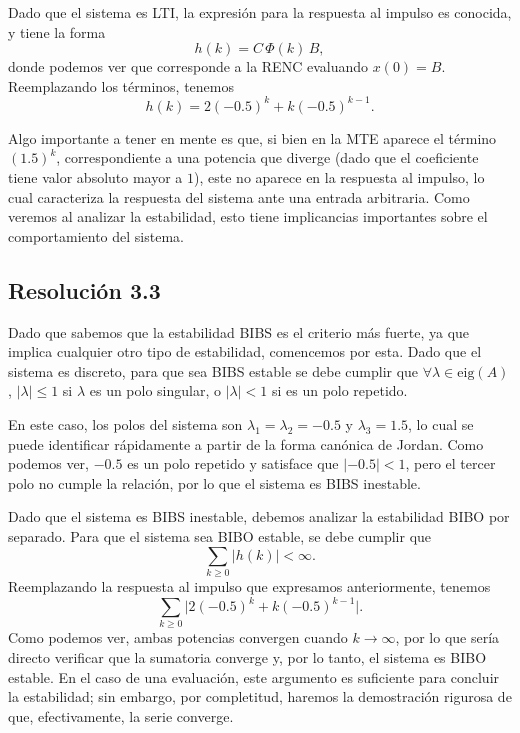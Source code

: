 \documentclass[
  11pt,
  letterpaper,
   addpoints,
  answers
  ]{exam}
\begin{document}
\begin{questions}
\begin{solution}
Dado que el sistema es LTI, la expresión para la respuesta al impulso es conocida, y tiene la forma
\begin{equation}
h(k)=C\,\Phi(k)\,B,
\tag{9}
\end{equation}
donde podemos ver que corresponde a la RENC evaluando $x(0)=B$. Reemplazando los términos, tenemos
\begin{equation}
h(k)=2(-0.5)^{k}+k(-0.5)^{k-1}.
\tag{10}
\end{equation}

Algo importante a tener en mente es que, si bien en la MTE aparece el término $(1.5)^{k}$, correspondiente a una potencia que diverge (dado que el coeficiente tiene valor absoluto mayor a $1$), este no aparece en la respuesta al impulso, lo cual caracteriza la respuesta del sistema ante una entrada arbitraria. Como veremos al analizar la estabilidad, esto tiene implicancias importantes sobre el comportamiento del sistema.

\subsection*{Resolución 3.3}

Dado que sabemos que la estabilidad BIBS es el criterio más fuerte, ya que implica cualquier otro tipo de estabilidad, comencemos por esta. Dado que el sistema es discreto, para que sea BIBS estable se debe cumplir que $\forall \lambda \in \mathrm{eig}(A)$, $|\lambda|\le 1$ si $\lambda$ es un polo singular, o $|\lambda|<1$ si es un polo repetido.

En este caso, los polos del sistema son $\lambda_{1}=\lambda_{2}=-0.5$ y $\lambda_{3}=1.5$, lo cual se puede identificar rápidamente a partir de la forma canónica de Jordan. Como podemos ver, $-0.5$ es un polo repetido y satisface que $|{-0.5}|<1$, pero el tercer polo no cumple la relación, por lo que el sistema es BIBS inestable.

Dado que el sistema es BIBS inestable, debemos analizar la estabilidad BIBO por separado. Para que el sistema sea BIBO estable, se debe cumplir que
\begin{equation}
\sum_{k\ge 0} |h(k)| < \infty.
\tag{11}
\end{equation}
Reemplazando la respuesta al impulso que expresamos anteriormente, tenemos
\begin{equation}
\sum_{k\ge 0} \big| 2(-0.5)^{k}+k(-0.5)^{k-1} \big|.
\tag{12}
\end{equation}
Como podemos ver, ambas potencias convergen cuando $k\to\infty$, por lo que sería directo verificar que la sumatoria converge y, por lo tanto, el sistema es BIBO estable. En el caso de una evaluación, este argumento es suficiente para concluir la estabilidad; sin embargo, por completitud, haremos la demostración rigurosa de que, efectivamente, la serie converge.


\end{solution}
\end{questions}
\end{document}
